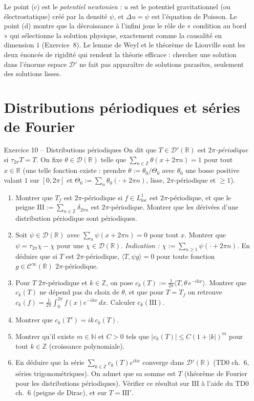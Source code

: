 \documentclass[11pt,a4paper]{article}
\newcommand{\R}{\mathbb{R}}
\newcommand{\N}{\mathbb{N}}
\newcommand{\Z}{\mathbb{Z}}
\newcommand{\Cinf}{\mathcal{C}^\infty}
\newcommand{\D}{\mathcal{D}}
\newcommand{\Sha}{\mathrm{III}}
\theoremstyle{definition}
\begin{document}
\begin{commentaire}
Le point (c) est le \emph{potentiel newtonien} : $u$ est le potentiel gravitationnel (ou électrostatique) créé par la densité $\psi$, et $\Delta u=\psi$ est l'équation de Poisson. Le point (d) montre que la décroissance à l'infini joue le rôle de « condition au bord » qui sélectionne la solution physique, exactement comme la causalité en dimension $1$ (Exercice~8). Le lemme de Weyl et le théorème de Liouville sont les deux énoncés de rigidité qui rendent la théorie efficace : chercher une solution dans l'énorme espace $\D'$ ne fait pas apparaître de solutions parasites, seulement des solutions lisses.
\end{commentaire}

\section*{Distributions périodiques et séries de Fourier}

\begin{exo}{Exercice 10 -- Distributions périodiques}
On dit que $T\in\D'(\R)$ est \emph{$2\pi$-périodique} si $\tau_{2\pi}T=T$. On fixe $\theta\in\D(\R)$ telle que $\sum_{n\in\Z}\theta(x+2\pi n)=1$ pour tout $x\in\R$ (une telle fonction existe : prendre $\theta:=\theta_0/\Theta_0$ avec $\theta_0$ une bosse positive valant $1$ sur $[0,2\pi]$ et $\Theta_0:=\sum_n\theta_0(\cdot+2\pi n)$, lisse, $2\pi$-périodique et $\ge1$).
\begin{enumerate}[label=(\alph*)]
  \item Montrer que $T_f$ est $2\pi$-périodique si $f\in L^1_{\mathrm{loc}}$ est $2\pi$-périodique, et que le peigne $\Sha:=\sum_{n\in\Z}\delta_{2\pi n}$ est $2\pi$-périodique. Montrer que les dérivées d'une distribution périodique sont périodiques.
  \item Soit $\psi\in\D(\R)$ avec $\sum_n\psi(x+2\pi n)=0$ pour tout $x$. Montrer que $\psi=\tau_{2\pi}\chi-\chi$ pour une $\chi\in\D(\R)$. \emph{Indication : $\chi:=\sum_{n\ge1}\psi(\cdot+2\pi n)$.} En déduire que si $T$ est $2\pi$-périodique, $\langle T,\psi g\rangle=0$ pour toute fonction $g\in\Cinf(\R)$ $2\pi$-périodique.
  \item Pour $T$ $2\pi$-périodique et $k\in\Z$, on pose $c_k(T):=\frac1{2\pi}\langle T,\theta\,e^{-ikx}\rangle$. Montrer que $c_k(T)$ ne dépend pas du choix de $\theta$, et que pour $T=T_f$ on retrouve $c_k(f)=\frac1{2\pi}\int_0^{2\pi}f(x)e^{-ikx}\,dx$. Calculer $c_k(\Sha)$.
  \item Montrer que $c_k(T')=ik\,c_k(T)$.
  \item Montrer qu'il existe $m\in\N$ et $C>0$ tels que $|c_k(T)|\le C(1+|k|)^m$ pour tout $k\in\Z$ (croissance polynomiale).
  \item En déduire que la série $\sum_{k\in\Z}c_k(T)e^{ikx}$ converge dans $\D'(\R)$ (TD0 ch.~6, séries trigonométriques). On admet que sa somme est $T$ (théorème de Fourier pour les distributions périodiques). Vérifier ce résultat sur $\Sha$ à l'aide du TD0 ch.~6 (peigne de Dirac), et sur $T=\Sha'$.
\end{enumerate}
\end{exo}
\end{document}

